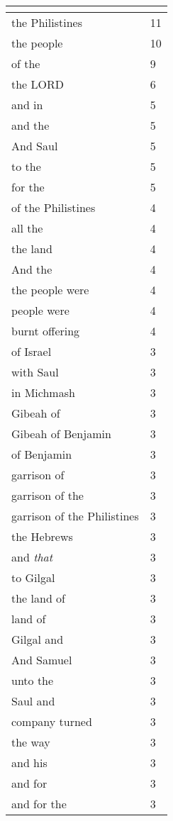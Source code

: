 \begin{center}
\begin{longtable}{|p{3.0in}|p{0.5in}|}
\hline \multicolumn{2}{c}{{ }} \\ \hline
\endfoot 
the Philistines & 11\\ \hline 
the people & 10\\ \hline 
of the & 9\\ \hline 
the LORD & 6\\ \hline 
and in & 5\\ \hline 
and the & 5\\ \hline 
And Saul & 5\\ \hline 
to the & 5\\ \hline 
for the & 5\\ \hline 
of the Philistines & 4\\ \hline 
all the & 4\\ \hline 
the land & 4\\ \hline 
And the & 4\\ \hline 
the people were & 4\\ \hline 
people were & 4\\ \hline 
burnt offering & 4\\ \hline 
of Israel & 3\\ \hline 
with Saul & 3\\ \hline 
in Michmash & 3\\ \hline 
Gibeah of & 3\\ \hline 
Gibeah of Benjamin & 3\\ \hline 
of Benjamin & 3\\ \hline 
garrison of & 3\\ \hline 
garrison of the & 3\\ \hline 
garrison of the Philistines & 3\\ \hline 
the Hebrews & 3\\ \hline 
and \emph{that} & 3\\ \hline 
to Gilgal & 3\\ \hline 
the land of & 3\\ \hline 
land of & 3\\ \hline 
Gilgal and & 3\\ \hline 
And Samuel & 3\\ \hline 
unto the & 3\\ \hline 
Saul and & 3\\ \hline 
company turned & 3\\ \hline 
the way & 3\\ \hline 
and his & 3\\ \hline 
and for & 3\\ \hline 
and for the & 3\\ \hline 
\end{longtable}
\end{center}





